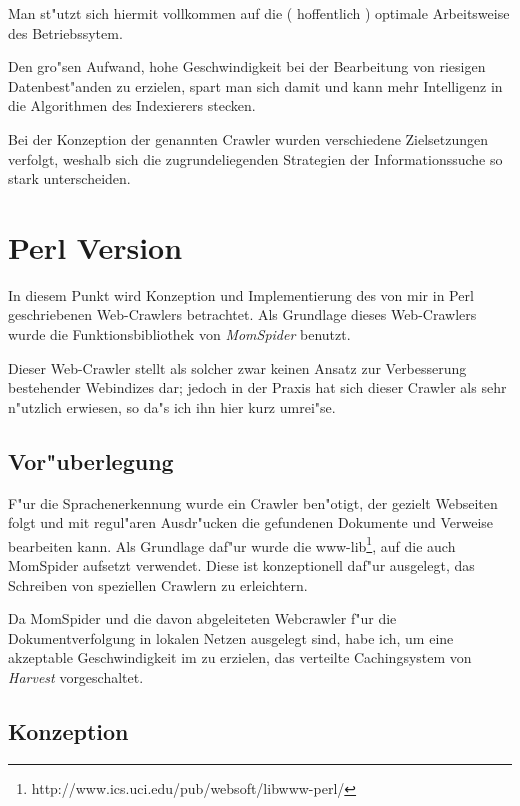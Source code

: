 \begin{description}
\begin{itemize}
	Man st"utzt sich hiermit vollkommen auf die ( hoffentlich ) optimale Arbeitsweise des Betriebssytem. 
	
	Den gro"sen Aufwand, hohe Geschwindigkeit bei der Bearbeitung von riesigen Datenbest"anden zu erzielen, spart man sich damit und kann mehr Intelligenz in die Algorithmen des Indexierers stecken. 
	\end{itemize}
\end{description}

Bei der Konzeption der genannten Crawler wurden verschiedene Zielsetzungen verfolgt, weshalb sich die zugrundeliegenden Strategien der Informationssuche so stark unterscheiden.



\section{Perl Version}

In diesem Punkt wird Konzeption und Implementierung des von mir in Perl geschriebenen Web-Crawlers betrachtet. Als Grundlage dieses Web-Crawlers wurde die Funktionsbibliothek von {\em MomSpider} benutzt.

Dieser Web-Crawler stellt als solcher zwar keinen Ansatz zur Verbesserung bestehender Webindizes dar; jedoch in der Praxis hat sich dieser Crawler als sehr n"utzlich erwiesen, so da"s ich ihn hier kurz umrei"se.

\subsection{Vor"uberlegung}
F"ur die Sprachenerkennung wurde ein Crawler ben"otigt, der gezielt Webseiten folgt und mit regul"aren Ausdr"ucken die gefundenen Dokumente und Verweise bearbeiten kann. Als Grundlage daf"ur wurde die www-lib\footnote{http://www.ics.uci.edu/pub/websoft/libwww-perl/}, auf die auch MomSpider aufsetzt verwendet. Diese ist konzeptionell daf"ur ausgelegt, das Schreiben von speziellen Crawlern zu erleichtern.

Da MomSpider und die davon abgeleiteten Webcrawler f"ur die Dokumentverfolgung in lokalen Netzen ausgelegt sind, habe ich, um eine akzeptable Geschwindigkeit im \www zu erzielen, das verteilte Cachingsystem von {\em Harvest} vorgeschaltet.

\subsection{Konzeption}

